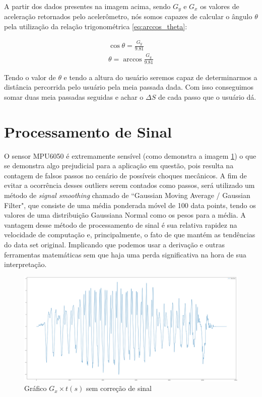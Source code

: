 \documentclass{article}
\newcommand{\n}{\nonumber \\ }
\begin{document}
   
            A partir dos dados presentes na imagem acima, sendo $G_y$ e $G_x$ os valores de aceleração
            retornados pelo acelerômetro, nós somos capazes de calcular o ângulo $\theta$ pela utilização da
             relação trigonométrica \ref{eq:arccos_theta}:

            \begin{align}
                \cos{\theta} = \frac{G_y}{9.81} \n 
                \theta = \arccos{\frac{G_y}{9.81}} \label{eq:arccos_theta}
            \end{align}

            Tendo o valor de $\theta$ e tendo a altura do usuário seremos capaz de determinarmos a distância
            percorrida pelo usuário pela meia passada dada. Com isso conseguimos somar duas meia passadas
            seguidas e achar o $\Delta S$ de cada passo que o usuário dá.

        \section{Processamento de Sinal}
            O sensor MPU6050 é extremamente sensível (como demonstra a imagem \ref{img:raw_plot}) o que se demonstra algo
            prejudicial para a aplicação em questão, pois resulta na contagem de falsos passos no cenário de
            possíveis choques mecânicos. A fim de evitar a ocorrência desses outliers serem contados como
            passos, será utilizado um método de \textit{signal smoothing} chamado de ``Gaussian Moving Average /
            Gaussian Filter", que consiste de uma média ponderada móvel de 100 data points, tendo os valores
            de uma distribuição Gaussiana Normal como os pesos para a média. A vantagem desse método de
            processamento de sinal é sua relativa rapidez na velocidade de computação e, principalmente, o
            fato de que mantém as tendências do data set original. Implicando que podemos usar a derivação e
            outras ferramentas matemáticas sem que haja uma perda significativa na hora de sua interpretação.
            
            \begin{figure}[h!]
                \centering
                \includegraphics[width=.8\textwidth]{img/Raw_Data.png} 
                \caption{Gráfico $G_x \times t(s)$ sem correção de sinal}
                \label{img:raw_plot} 
            \end{figure}
\end{document}

